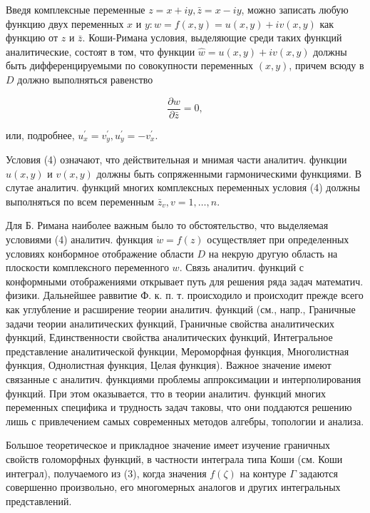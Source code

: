 \documentclass[10pt]{article}
\begin{document}
Введя комплексные переменные $z=x+i y, \bar{z}=x-i y$, можно записать любую функцию двух переменных $x$ и $y: w=f(x, y)=u(x, y)+i v(x, y)$ как функцию от $z$ и $\bar{z}$. Коши-Римана условия, выделяющие среди таких функций аналитические, состоят в том, что функции $\hat{w}=u(x, y)+i v(x, y)$ должны быть дифференцируемыми по совокупности переменных $(x, y)$, причем всюду в $D$ должно выполняться равенство



\[

\frac{\partial w}{\partial \bar{z}}=0,

\]



или, подробнее, $u_{x}^{\prime}=v_{y}^{\prime}, u_{y}^{\prime}=-v_{x}^{\prime}$.



Условия (4) означают, что действительная и мнимая части аналитич. функции $u(x, y)$ и $v(x, y)$ должны быть сопряженными гармоническими функциями. В слутае аналитич. функций многих комплексных переменных условия (4) должны выполняться по всем переменным $\bar{z}_{v}, v=1, \ldots, n$.



Для Б. Римана наиболее важным было то обстоятельство, что выделяемая условиями (4) аналитич. функция $\dot{w}=f(z)$ осуществляет при определенных условиях конбормное отображение области $D$ на некрую другую область на плоскости комплексного переменного $w$. Связь аналитич. функций с конформными отображениями открывает путь для решения ряда задач математич. физики. Дальнейшее раввитие Ф. к. п. т. происходило и происходит прежде всего как углубление и расширение теории аналитич. функций (см., напр., Граничные задачи теории аналитических функций, Граничные свойства аналитических функций, Единственности свойства аналитических функций, Интегральное представление аналитической функции, Мероморфная функция, Многолистная функция, Однолистная функция, Целая функция). Важное значение имеют связанные с аналитич. функциями проблемы аппроксимации и интерполирования функций. При этом оказывается, тто в теории аналитич. функций многих переменных специфика и трудность задач таковы, что они поддаются решению лишь с привлечением самых современных методов алгебры, топологии и анализа.



Большое теоретическое и прикладное значение имеет изучение граничных свойств голоморфных функций, в частности интеграла типа Коши (см. Коши интеграл), получаемого из (3), когда значения $f(\zeta)$ на контуре $\Gamma$ задаются совершенно произвольно, его многомерных аналогов и других интегральных представлений.
\end{document}
